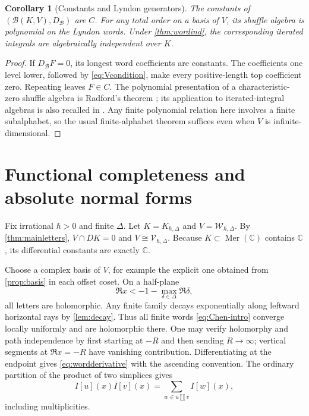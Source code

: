 \documentclass[11pt]{article}
\numberwithin{equation}{section}
\newtheorem{corollary}[corollary]{Corollary}
\theoremstyle{definition}
\theoremstyle{remark}
\newcommand{\C}{\mathbb C}
\newcommand{\Mer}{\operatorname{Mer}}
\newcommand{\calW}{\mathcal W}
\newcommand{\calV}{\mathcal V}
\newcommand{\calB}{\mathcal B}
\newcommand{\qh}{\hbar}
\newcommand{\shuffle}{\mathbin{\amalg}}
\begin{document}
\begin{corollary}[Constants and Lyndon generators]\label{cor:lyndon}
The constants of $(\calB(K,V),D_{\calB})$ are $C$. For any total order on a
basis of $V$, its shuffle algebra is polynomial on the Lyndon words. Under
\cref{thm:wordind}, the corresponding iterated integrals are algebraically
independent over $K$.
\end{corollary}
\begin{proof}
If $D_{\calB}F=0$, its longest word coefficients are constants. The
coefficients one level lower, followed by \eqref{eq:Vcondition}, make every
positive-length top coefficient zero. Repeating leaves $F\in C$.
The polynomial presentation of a characteristic-zero shuffle algebra is
Radford's theorem \cite{Radford1979}; its application to iterated-integral
algebras is also recalled in \cite[Section~6]{Brown2009}. Any finite
polynomial relation here involves a finite subalphabet, so the usual
finite-alphabet theorem suffices even when $V$ is infinite-dimensional.
\end{proof}

\section{Functional completeness and absolute normal forms}\label{sec:completeness}

Fix irrational $\qh>0$ and finite $\Delta$. Let
$K=K_{\qh,\Delta}$ and $V=\calW_{\qh,\Delta}$. By
\cref{thm:mainletters}, $V\cap DK=0$ and $V\cong\calV_{\qh,\Delta}$.
Because $K\subset\Mer(\C)$ contains $\C$, its differential constants are
exactly $\C$.

Choose a complex basis of $V$, for example the explicit one obtained from
\cref{prop:basis} in each offset coset. On a half-plane
\[
 \Re x<-1-\max_{\delta\in\Delta}\Re\delta,
\]
all letters are holomorphic. Any finite family decays exponentially along
leftward horizontal rays by \cref{lem:decay}. Thus all finite words
\eqref{eq:Chen-intro} converge locally uniformly and are holomorphic there.
One may verify holomorphy and path independence by first starting at $-R$
and then sending $R\to\infty$; vertical segments at $\Re x=-R$ have vanishing
contribution. Differentiating at the endpoint gives
\eqref{eq:wordderivative} with the ascending convention. The ordinary
partition of the product of two simplices gives
\begin{equation}\label{eq:shuffleidentity}
 I[u](x)I[v](x)=\sum_{w\in u\shuffle v}I[w](x),
\end{equation}
including multiplicities.
\end{document}
